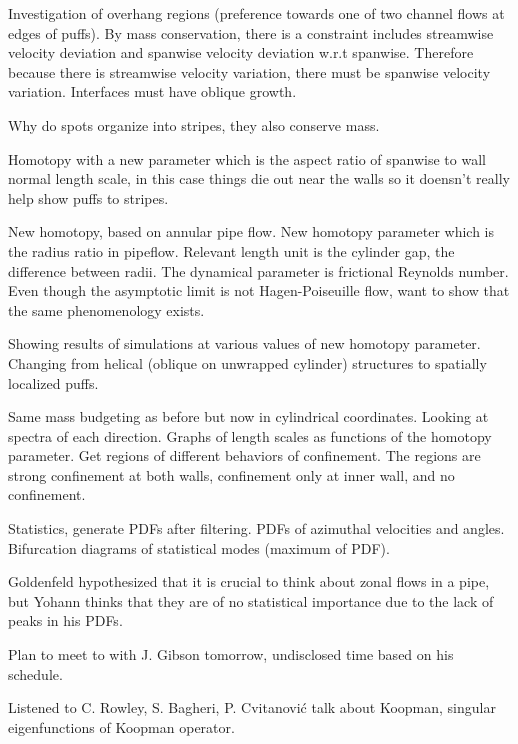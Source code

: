 \begin{description}
{\begin{description}
Investigation of overhang regions (preference towards one of two channel flows at edges of puffs).
By mass conservation, there is a constraint includes streamwise velocity deviation and spanwise velocity
deviation w.r.t spanwise. Therefore because there is streamwise velocity variation, there must be
spanwise velocity variation. Interfaces must have oblique growth.

Why do spots organize into stripes, they also conserve mass.

Homotopy with a new parameter which is the aspect ratio of spanwise to wall normal length scale,
in this case things die out near the walls so it doensn't really help show puffs to stripes.

New homotopy, based on annular pipe flow. New homotopy parameter which is the radius ratio
in pipeflow. Relevant length unit is the cylinder gap, the difference between radii. The
dynamical parameter is frictional Reynolds number. Even though the asymptotic limit
is not Hagen-Poiseuille flow, want to show that the same phenomenology exists.

Showing results of simulations at various values of new homotopy parameter. Changing
from helical (oblique on unwrapped cylinder) structures to spatially localized
puffs.

Same mass budgeting as before but now in cylindrical coordinates.
Looking at spectra of each direction. Graphs of length scales as
functions of the homotopy parameter. Get regions of different behaviors
of confinement. The regions are strong confinement at both walls,
confinement only at inner wall, and no confinement.

Statistics, generate PDFs after filtering. PDFs of azimuthal velocities
and angles. Bifurcation diagrams of statistical modes (maximum of PDF).

Goldenfeld hypothesized that it is crucial to think about zonal flows
in a pipe, but Yohann thinks that they are of no statistical importance
due to the lack of peaks in his PDFs.

\item[P. Cvitanovi\'c Math Colloquium]

\item[periodic eigendecomposition]
Plan to meet to with J. Gibson tomorrow, undisclosed time based on his schedule.
\item[Misc.]
Listened to C. Rowley, S. Bagheri, P. Cvitanovi\'c talk about Koopman,
singular eigenfunctions of Koopman operator.
\end{description}
}


\end{description}
